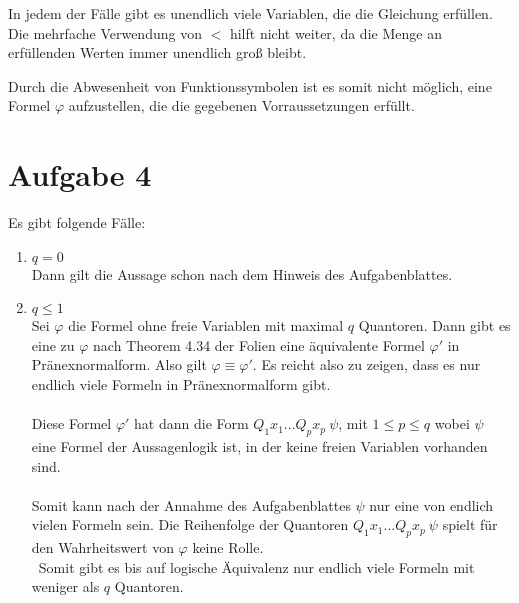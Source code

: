 \documentclass[a4paper,10pt]{article}
\begin{document}
\begin{enumerate}[(i)]
\begin{itemize}
In jedem der Fälle gibt es unendlich viele Variablen, die die Gleichung erfüllen. Die mehrfache Verwendung von $<$ hilft nicht weiter, da die Menge an erfüllenden Werten immer unendlich groß bleibt. 

Durch die Abwesenheit von Funktionssymbolen ist es somit nicht möglich, eine Formel $\varphi$ aufzustellen, die die gegebenen Vorraussetzungen erfüllt.
\end{itemize}
\end{enumerate}

\section*{Aufgabe 4}
Es gibt folgende Fälle:
\begin{enumerate}
\item{$q = 0$}\\
Dann gilt die Aussage schon nach dem Hinweis des Aufgabenblattes.
\item{$q \le 1$}\\
Sei $\varphi$ die Formel ohne freie Variablen mit maximal $q$ Quantoren. Dann gibt es eine zu $\varphi$ nach Theorem 4.34 der Folien eine äquivalente Formel $\varphi'$ in Pränexnormalform. Also gilt $\varphi \equiv \varphi'$. Es reicht also zu zeigen, dass es nur endlich viele Formeln in Pränexnormalform gibt.
\\\\
Diese Formel $\varphi'$ hat dann die Form $Q_1x_1...Q_px_p\ \psi$, mit $1 \le p \le q$ wobei $\psi$ eine Formel der Aussagenlogik ist, in der keine freien Variablen vorhanden sind. 
\\\\
Somit kann nach der Annahme des Aufgabenblattes $\psi$ nur eine von endlich vielen Formeln sein.  Die Reihenfolge der Quantoren $Q_1x_1...Q_px_p\ \psi$ spielt für den Wahrheitswert von $\varphi$ keine Rolle. 
\\\
Somit gibt es bis auf logische Äquivalenz nur endlich viele Formeln mit weniger als $q$ Quantoren.
\end{enumerate}
\end{document}
